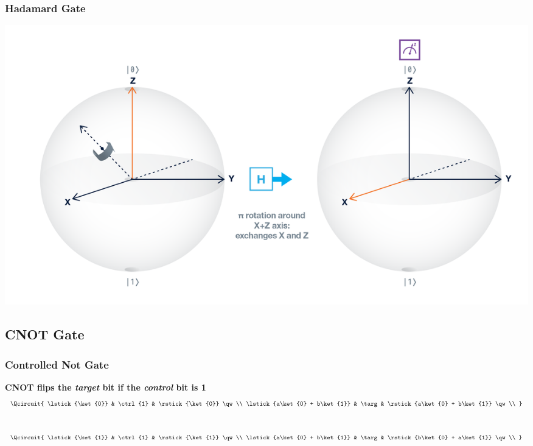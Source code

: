 \documentclass[aspectratio=169,11pt,hyperref={colorlinks=true}]{beamer}
\begin{document}
\begin{frame}
    \frametitle{Hadamard Gate}
    \centering
    \includegraphics[width=\textwidth]{gate_h_bloch.png}
\end{frame}

\subsection{CNOT Gate}
\begin{frame}
    \frametitle{Controlled Not Gate}
    \centering
    \textbf{CNOT flips the \textit{target} bit if the \textit{control} bit is 1}
    \begin{equation*}
        \Qcircuit {
            \lstick{\ket{0}}  & \ctrl{1} & \rstick{\ket{0}} \qw \\ 
            \lstick{a\ket{0} + b\ket{1}} &  \targ & \rstick{a\ket{0} + b\ket{1}} \qw \\
    }
    \end{equation*}\\
    \vspace{3em}
    \begin{equation*}
        \Qcircuit {
            \lstick{\ket{1}} & \ctrl{1} & \rstick{\ket{1}} \qw\\ 
            \lstick{a\ket{0} + b\ket{1}} & \targ & \rstick{b\ket{0} + a\ket{1}} \qw\\
    }
    \end{equation*}
\end{frame}
\end{document}
